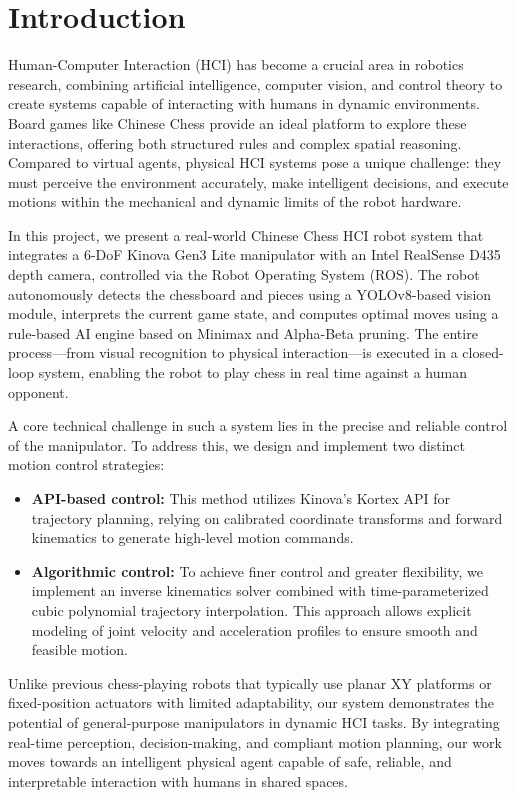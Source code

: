 \documentclass[conference]{IEEEtran}
\begin{document}
\section{Introduction}
Human-Computer Interaction (HCI) has become a crucial area in robotics research, combining artificial intelligence, computer vision, and control theory to create systems capable of interacting with humans in dynamic environments. Board games like Chinese Chess provide an ideal platform to explore these interactions, offering both structured rules and complex spatial reasoning. Compared to virtual agents, physical HCI systems pose a unique challenge: they must perceive the environment accurately, make intelligent decisions, and execute motions within the mechanical and dynamic limits of the robot hardware.

In this project, we present a real-world Chinese Chess HCI robot system that integrates a 6-DoF Kinova Gen3 Lite manipulator with an Intel RealSense D435 depth camera, controlled via the Robot Operating System (ROS). The robot autonomously detects the chessboard and pieces using a YOLOv8-based vision module, interprets the current game state, and computes optimal moves using a rule-based AI engine based on Minimax and Alpha-Beta pruning. The entire process—from visual recognition to physical interaction—is executed in a closed-loop system, enabling the robot to play chess in real time against a human opponent.

A core technical challenge in such a system lies in the precise and reliable control of the manipulator. To address this, we design and implement two distinct motion control strategies:

\begin{itemize}
	\item \textbf{API-based control:} This method utilizes Kinova's Kortex API for trajectory planning, relying on calibrated coordinate transforms and forward kinematics to generate high-level motion commands.
	\item \textbf{Algorithmic control:} To achieve finer control and greater flexibility, we implement an inverse kinematics solver combined with time-parameterized cubic polynomial trajectory interpolation. This approach allows explicit modeling of joint velocity and acceleration profiles to ensure smooth and feasible motion.
\end{itemize}

Unlike previous chess-playing robots that typically use planar XY platforms or fixed-position actuators with limited adaptability, our system demonstrates the potential of general-purpose manipulators in dynamic HCI tasks. By integrating real-time perception, decision-making, and compliant motion planning, our work moves towards an intelligent physical agent capable of safe, reliable, and interpretable interaction with humans in shared spaces.
\end{document}
